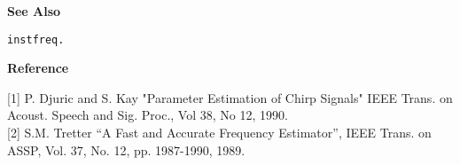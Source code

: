 {\bf \large {}\selectfont See Also}\\
\hspace*{1.5cm}
\begin{minipage}[t]{13.5cm}
\begin{verbatim}
instfreq.
\end{verbatim}
\end{minipage}
\vspace*{.5cm}


{\bf \large {}\selectfont Reference}\\
\hspace*{1.5cm}
\begin{minipage}[t]{13.5cm}
[1] P. Djuric and S. Kay "Parameter Estimation of Chirp Signals"
IEEE Trans. on Acoust. Speech and Sig. Proc., Vol 38, No 12, 1990.\\

[2] S.M. Tretter ``A Fast and Accurate Frequency Estimator'', IEEE
Trans. on ASSP, Vol. 37, No. 12, pp. 1987-1990, 1989.
\end{minipage}
